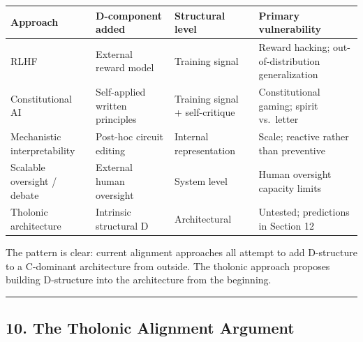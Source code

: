 \documentclass[
  11pt,
  letterpaper,
]{article}
\begin{document}
\begin{longtable}[]{@{}
  >{\raggedright\arraybackslash}p{}
  >{\raggedright\arraybackslash}p{}
  >{\raggedright\arraybackslash}p{}
  >{\raggedright\arraybackslash}p{}@{}}
\toprule\noalign{}
\begin{minipage}[b]{\linewidth}\raggedright
Approach
\end{minipage} & \begin{minipage}[b]{\linewidth}\raggedright
D-component added
\end{minipage} & \begin{minipage}[b]{\linewidth}\raggedright
Structural level
\end{minipage} & \begin{minipage}[b]{\linewidth}\raggedright
Primary vulnerability
\end{minipage} \\
\midrule\noalign{}
\endhead
\bottomrule\noalign{}
\endlastfoot
RLHF & External reward model & Training signal & Reward hacking;
out-of-distribution generalization \\
Constitutional AI & Self-applied written principles & Training signal +
self-critique & Constitutional gaming; spirit vs.~letter \\
Mechanistic interpretability & Post-hoc circuit editing & Internal
representation & Scale; reactive rather than preventive \\
Scalable oversight / debate & External human oversight & System level &
Human oversight capacity limits \\
Tholonic architecture & Intrinsic structural D & Architectural &
Untested; predictions in Section 12 \\
\end{longtable}

The pattern is clear: current alignment approaches all attempt to add
D-structure to a C-dominant architecture from outside. The tholonic
approach proposes building D-structure into the architecture from the
beginning.

\begin{center}\rule{0.5\linewidth}{0.5pt}\end{center}

\subsection{10. The Tholonic Alignment
Argument}\label{the-tholonic-alignment-argument}
\end{document}
